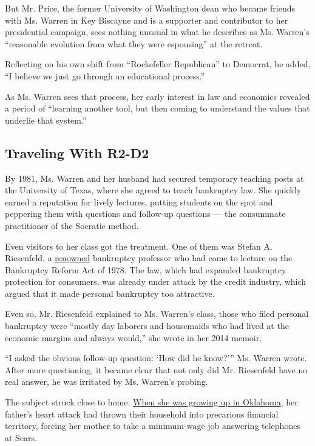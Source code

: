 But Mr. Price, the former University of Washington dean who became
friends with Ms. Warren in Key Biscayne and is a supporter and
contributor to her presidential campaign, sees nothing unusual in what
he describes as Ms. Warren's ``reasonable evolution from what they were
espousing'' at the retreat.

Reflecting on his own shift from ``Rockefeller Republican'' to Democrat,
he added, ``I believe we just go through an educational process.''

As Ms. Warren sees that process, her early interest in law and economics
revealed a period of ``learning another tool, but then coming to
understand the values that underlie that system.''

\hypertarget{traveling-with-r2-d2}{%
\subsection{Traveling With R2-D2}\label{traveling-with-r2-d2}}

By 1981, Ms. Warren and her husband had secured temporary teaching posts
at the University of Texas, where she agreed to teach bankruptcy law.
She quickly earned a reputation for lively lectures, putting students on
the spot and peppering them with questions and follow-up questions ---
the consummate practitioner of the Socratic method.

Even visitors to her class got the treatment. One of them was Stefan A.
Riesenfeld, a
\href{https://www.nytimes3xbfgragh.onion/1999/03/13/us/stefan-a-riesenfeld-90-expert-on-international-law.html}{renowned}
bankruptcy professor who had come to lecture on the Bankruptcy Reform
Act of 1978. The law, which had expanded bankruptcy protection for
consumers, was already under attack by the credit industry, which argued
that it made personal bankruptcy too attractive.

Even so, Mr. Riesenfeld explained to Ms. Warren's class, those who filed
personal bankruptcy were ``mostly day laborers and housemaids who had
lived at the economic margins and always would,'' she wrote in her 2014
memoir.

``I asked the obvious follow-up question: `How did he know?''' Ms.
Warren wrote. After more questioning, it became clear that not only did
Mr. Riesenfeld have no real answer, he was irritated by Ms. Warren's
probing.

The subject struck close to home.
\href{https://www.nytimes3xbfgragh.onion/2019/12/23/us/politics/elizabeth-warren-oklahoma-native-american.html}{When
she was growing up in Oklahoma}, her father's heart attack had thrown
their household into precarious financial territory, forcing her mother
to take a minimum-wage job answering telephones at Sears.

